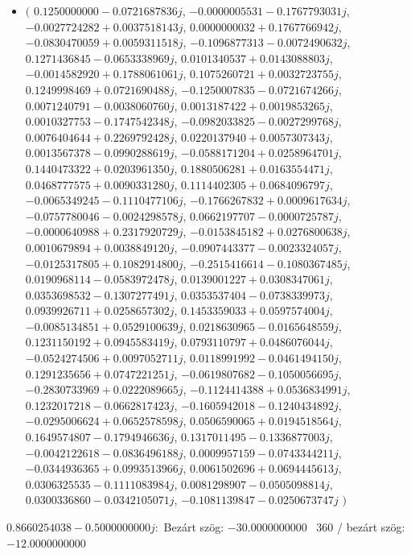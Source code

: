 \documentclass[14pt,a4paper]{article}
\begin{document}
\begin{itemize}
\item
$\big($
$0.1250000000-0.0721687836j$, $-0.0000005531-0.1767793031j$, $-0.0027724282+0.0037518143j$, $0.0000000032+0.1767766942j$, $-0.0830470059+0.0059311518j$, $-0.1096877313-0.0072490632j$, $0.1271436845-0.0653338969j$, $0.0101340537+0.0143088803j$, $-0.0014582920+0.1788061061j$, $0.1075260721+0.0032723755j$, $0.1249998469+0.0721690488j$, $-0.1250007835-0.0721674266j$, $0.0071240791-0.0038060760j$, $0.0013187422+0.0019853265j$, $0.0010327753-0.1747542348j$, $-0.0982033825-0.0027299768j$, $0.0076404644+0.2269792428j$, $0.0220137940+0.0057307343j$, $0.0013567378-0.0990288619j$, $-0.0588171204+0.0258964701j$, $0.1440473322+0.0203961350j$, $0.1880506281+0.0163554471j$, $0.0468777575+0.0090331280j$, $0.1114402305+0.0684096797j$, $-0.0065349245-0.1110477106j$, $-0.1766267832+0.0009617634j$, $-0.0757780046-0.0024298578j$, $0.0662197707-0.0000725787j$, $-0.0000640988+0.2317920729j$, $-0.0153845182+0.0276800638j$, $0.0010679894+0.0038849120j$, $-0.0907443377-0.0023324057j$, $-0.0125317805+0.1082914800j$, $-0.2515416614-0.1080367485j$, $0.0190968114-0.0583972478j$, $0.0139001227+0.0308347061j$, $0.0353698532-0.1307277491j$, $0.0353537404-0.0738339973j$, $0.0939926711+0.0258657302j$, $0.1453359033+0.0597574004j$, $-0.0085134851+0.0529100639j$, $0.0218630965-0.0165648559j$, $0.1231150192+0.0945583419j$, $0.0793110797+0.0486076044j$, $-0.0524274506+0.0097052711j$, $0.0118991992-0.0461494150j$, $0.1291235656+0.0747221251j$, $-0.0619807682-0.1050056695j$, $-0.2830733969+0.0222089665j$, $-0.1124414388+0.0536834991j$, $0.1232017218-0.0662817423j$, $-0.1605942018-0.1240434892j$, $-0.0295006624+0.0652578598j$, $0.0506590065+0.0194518564j$, $0.1649574807-0.1794946636j$, $0.1317011495-0.1336877003j$, $-0.0042122618-0.0836496188j$, $0.0009957159-0.0743344211j$, $-0.0344936365+0.0993513966j$, $0.0061502696+0.0694445613j$, $0.0306325535-0.1111083984j$, $0.0081298907-0.0505098814j$, $0.0300336860-0.0342105071j$, $-0.1081139847-0.0250673747j$
$\big)$
\end{itemize}
$0.8660254038-0.5000000000j$:\
Bezárt szög: $-30.0000000000$ \
360 / bezárt szög: $-12.0000000000$\
\end{document}
